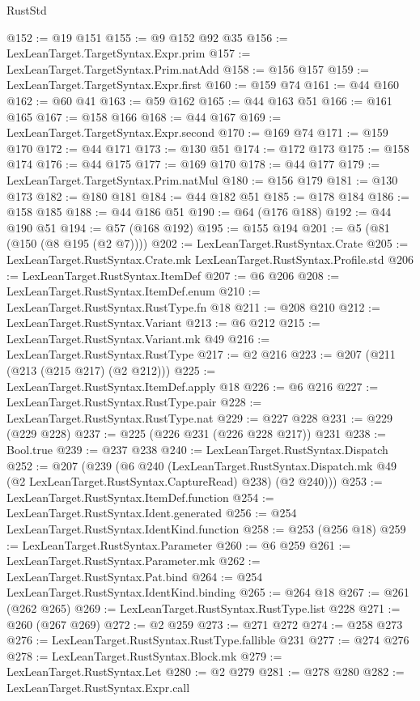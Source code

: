 \begin{lexlean}{RustStd}
\begin{coremodule}
@152 := @19 @151
@155 := @9 @152 @92 @35
@156 := LexLeanTarget.TargetSyntax.Expr.prim
@157 := LexLeanTarget.TargetSyntax.Prim.natAdd
@158 := @156 @157
@159 := LexLeanTarget.TargetSyntax.Expr.first
@160 := @159 @74
@161 := @44 @160
@162 := @60 @41
@163 := @59 @162
@165 := @44 @163 @51
@166 := @161 @165
@167 := @158 @166
@168 := @44 @167
@169 := LexLeanTarget.TargetSyntax.Expr.second
@170 := @169 @74
@171 := @159 @170
@172 := @44 @171
@173 := @130 @51
@174 := @172 @173
@175 := @158 @174
@176 := @44 @175
@177 := @169 @170
@178 := @44 @177
@179 := LexLeanTarget.TargetSyntax.Prim.natMul
@180 := @156 @179
@181 := @130 @173
@182 := @180 @181
@184 := @44 @182 @51
@185 := @178 @184
@186 := @158 @185
@188 := @44 @186 @51
@190 := @64 (@176 @188)
@192 := @44 @190 @51
@194 := @57 (@168 @192)
@195 := @155 @194
@201 := @5 (@81 (@150 (@8 @195 (@2 @7))))
@202 := LexLeanTarget.RustSyntax.Crate
@205 := LexLeanTarget.RustSyntax.Crate.mk LexLeanTarget.RustSyntax.Profile.std
@206 := LexLeanTarget.RustSyntax.ItemDef
@207 := @6 @206
@208 := LexLeanTarget.RustSyntax.ItemDef.enum
@210 := LexLeanTarget.RustSyntax.RustType.fn @18
@211 := @208 @210
@212 := LexLeanTarget.RustSyntax.Variant
@213 := @6 @212
@215 := LexLeanTarget.RustSyntax.Variant.mk @49
@216 := LexLeanTarget.RustSyntax.RustType
@217 := @2 @216
@223 := @207 (@211 (@213 (@215 @217) (@2 @212)))
@225 := LexLeanTarget.RustSyntax.ItemDef.apply @18
@226 := @6 @216
@227 := LexLeanTarget.RustSyntax.RustType.pair
@228 := LexLeanTarget.RustSyntax.RustType.nat
@229 := @227 @228
@231 := @229 (@229 @228)
@237 := @225 (@226 @231 (@226 @228 @217)) @231
@238 := Bool.true
@239 := @237 @238
@240 := LexLeanTarget.RustSyntax.Dispatch
@252 := @207
    (@239
      (@6
        @240
        (LexLeanTarget.RustSyntax.Dispatch.mk @49 (@2 LexLeanTarget.RustSyntax.CaptureRead) @238)
        (@2 @240)))
@253 := LexLeanTarget.RustSyntax.ItemDef.function
@254 := LexLeanTarget.RustSyntax.Ident.generated
@256 := @254 LexLeanTarget.RustSyntax.IdentKind.function
@258 := @253 (@256 @18)
@259 := LexLeanTarget.RustSyntax.Parameter
@260 := @6 @259
@261 := LexLeanTarget.RustSyntax.Parameter.mk
@262 := LexLeanTarget.RustSyntax.Pat.bind
@264 := @254 LexLeanTarget.RustSyntax.IdentKind.binding
@265 := @264 @18
@267 := @261 (@262 @265)
@269 := LexLeanTarget.RustSyntax.RustType.list @228
@271 := @260 (@267 @269)
@272 := @2 @259
@273 := @271 @272
@274 := @258 @273
@276 := LexLeanTarget.RustSyntax.RustType.fallible @231
@277 := @274 @276
@278 := LexLeanTarget.RustSyntax.Block.mk
@279 := LexLeanTarget.RustSyntax.Let
@280 := @2 @279
@281 := @278 @280
@282 := LexLeanTarget.RustSyntax.Expr.call

\end{coremodule}
\end{lexlean}
